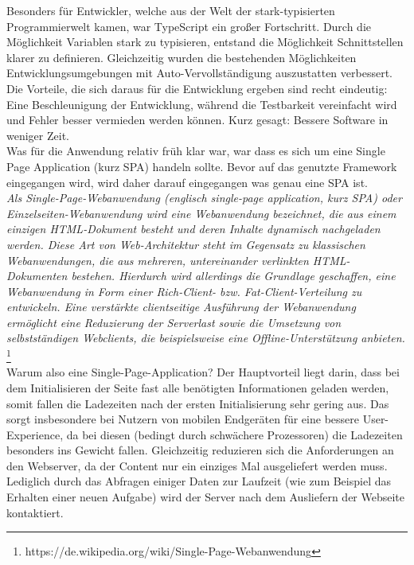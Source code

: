Besonders für Entwickler, welche aus der Welt der stark-typisierten Programmierwelt kamen, war TypeScript ein großer Fortschritt. Durch die Möglichkeit Variablen stark zu typisieren, entstand die Möglichkeit Schnittstellen klarer zu definieren. Gleichzeitig wurden die bestehenden Möglichkeiten Entwicklungsumgebungen mit Auto-Vervollständigung auszustatten verbessert. \\
Die Vorteile, die sich daraus für die Entwicklung ergeben sind recht eindeutig: Eine Beschleunigung der Entwicklung, während die Testbarkeit vereinfacht wird und Fehler besser vermieden werden können. Kurz gesagt: Bessere Software in weniger Zeit. \\

Was für die Anwendung relativ früh klar war, war dass es sich um eine Single Page Application (kurz SPA) handeln sollte. Bevor auf das genutzte Framework eingegangen wird, wird daher darauf eingegangen was genau eine SPA ist. \\


\emph{\glqq   
Als Single-Page-Webanwendung (englisch single-page application, kurz SPA) oder Einzelseiten-Webanwendung wird eine Webanwendung bezeichnet, die aus einem einzigen HTML-Dokument besteht und deren Inhalte dynamisch nachgeladen werden. Diese Art von Web-Architektur steht im Gegensatz zu klassischen Webanwendungen, die aus mehreren, untereinander verlinkten HTML-Dokumenten bestehen. Hierdurch wird allerdings die Grundlage geschaffen, eine Webanwendung in Form einer Rich-Client- bzw. Fat-Client-Verteilung zu entwickeln. Eine verstärkte clientseitige Ausführung der Webanwendung ermöglicht eine Reduzierung der Serverlast sowie die Umsetzung von selbstständigen Webclients, die beispielsweise eine Offline-Unterstützung anbieten.
\grqq} \footnote{https://de.wikipedia.org/wiki/Single-Page-Webanwendung} \\

Warum also eine Single-Page-Application? Der Hauptvorteil liegt darin, dass bei dem Initialisieren der Seite fast alle benötigten Informationen geladen werden, somit fallen die Ladezeiten nach der ersten Initialisierung sehr gering aus. Das sorgt insbesondere bei Nutzern von mobilen Endgeräten für eine bessere User-Experience, da bei diesen (bedingt durch schwächere Prozessoren) die Ladezeiten besonders ins Gewicht fallen. Gleichzeitig reduzieren sich die Anforderungen an den Webserver, da der Content nur ein einziges Mal ausgeliefert werden muss. Lediglich durch das Abfragen einiger Daten zur Laufzeit (wie zum Beispiel das Erhalten einer neuen Aufgabe) wird der Server nach dem Ausliefern der Webseite kontaktiert.\\

